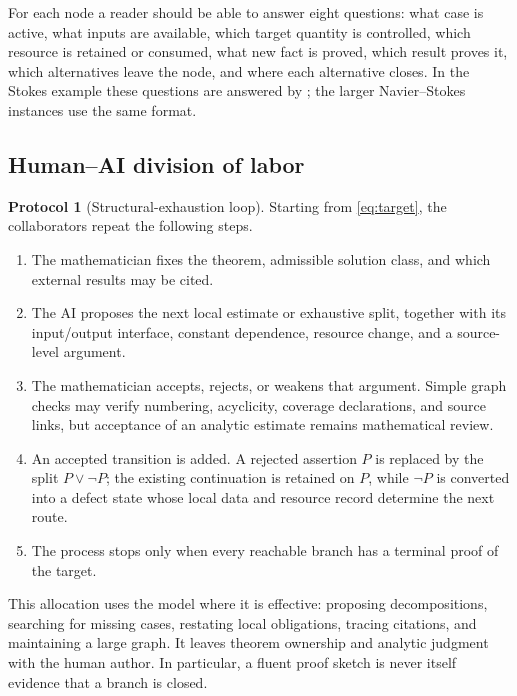 \documentclass[11pt,reqno]{amsart}
\theoremstyle{plain}
\theoremstyle{definition}
\newtheorem{protocol}[protocol]{Protocol}
\theoremstyle{remark}
\numberwithin{equation}{section}
\begin{document}
For each node a reader should be able to answer eight questions: what case is
active, what inputs are available, which target quantity is controlled, which
resource is retained or consumed, what new fact is proved, which result proves
it, which alternatives leave the node, and where each alternative closes.  In
the Stokes example these questions are answered by
; the larger Navier--Stokes instances use the same
format.

\subsection{Human--AI division of labor}

\begin{protocol}[Structural-exhaustion loop]\label{prot:loop}
Starting from \eqref{eq:target}, the collaborators repeat the following steps.

\begin{enumerate}
  \item The mathematician fixes the theorem, admissible solution class, and
  which external results may be cited.
  \item The AI proposes the next local estimate or exhaustive split, together
  with its input/output interface, constant dependence, resource change, and a
  source-level argument.
  \item The mathematician accepts, rejects, or weakens that argument.  Simple
  graph checks may verify numbering, acyclicity, coverage declarations, and
  source links, but acceptance of an analytic estimate remains mathematical
  review.
  \item An accepted transition is added.  A rejected assertion \(P\) is
  replaced by the split \(P\vee\neg P\); the existing continuation is retained
  on \(P\), while \(\neg P\) is converted into a defect state whose local data
  and resource record determine the next route.
  \item The process stops only when every reachable branch has a terminal
  proof of the target.
\end{enumerate}
\end{protocol}

This allocation uses the model where it is effective: proposing decompositions,
searching for missing cases, restating local obligations, tracing citations,
and maintaining a large graph.  It leaves theorem ownership and analytic
judgment with the human author.  In particular, a fluent proof sketch is never
itself evidence that a branch is closed.
\end{document}
